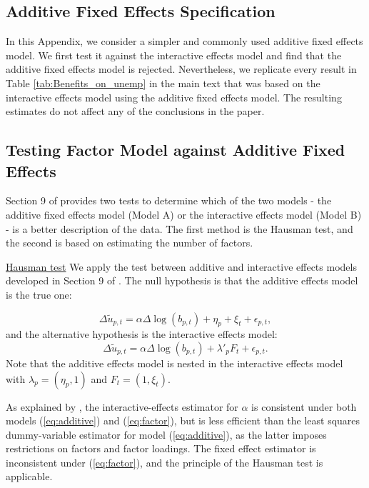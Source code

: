 \documentclass[12pt]{article}
\newcommand{\1}{\mathbf{1}}
\begin{document}
\begin{appendix}
\clearpage
\section{Additive Fixed Effects Specification}
\label{app:OLS}
In this Appendix, we consider a simpler and commonly used additive fixed effects model. We first test it against the interactive effects model and find that the additive fixed effects model is rejected. Nevertheless, we replicate every result in Table \ref{tab:Benefits_on_unemp} in the main text that was based on the interactive effects model using the additive fixed effects model. The resulting estimates do not affect any of the conclusions in the paper.


\subsection{Testing Factor Model against Additive Fixed Effects}

Section 9 of \citet{bai:09} provides two tests to determine which of the two models - the additive fixed effects model (Model A) or the interactive effects model (Model B) - is a better description of the data. The first method is the Hausman test, and the second is based on estimating the number of factors.

\underline{Hausman test}
We apply the test between additive and interactive effects models developed in Section 9 of \citet{bai:09}.  The null hypothesis is that the additive effects model is the true one:

\begin{equation}
    \Delta\tilde{u}_{p,t}=\alpha \Delta\log(b_{p,t})+\eta_p+\xi_t+\epsilon_{p,t},
    \label{eq:additive}
\end{equation}
and the alternative hypothesis is the interactive effects model:
\begin{equation}
    \Delta\tilde{u}_{p,t}=\alpha \Delta\log(b_{p,t})+\lambda'_p F_t+\epsilon_{p,t}.
    \label{eq:factor}
\end{equation}
Note that the additive effects model is nested in the interactive effects model with $\lambda_p=(\eta_p,1)$ and $F_t=(1,\xi_t)$.

As explained by \citet{bai:09}, the interactive-effects estimator for $\alpha$ is consistent under both models (\ref{eq:additive}) and (\ref{eq:factor}), but is less efficient than the least squares dummy-variable estimator for model (\ref{eq:additive}), as the latter imposes restrictions on factors and factor loadings. The fixed effect estimator is inconsistent under (\ref{eq:factor}), and the principle of the Hausman test is applicable.


\end{appendix}
\end{document}
